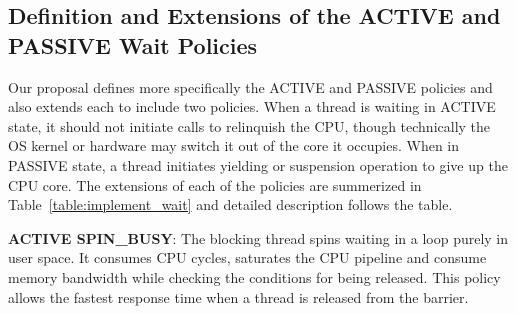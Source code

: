 \subsection{Definition and Extensions of the ACTIVE and PASSIVE Wait Policies}
Our proposal defines more specifically 
the ACTIVE and PASSIVE policies and also extends each to include two policies. 
When a thread is waiting in ACTIVE state, it should not initiate calls to
relinquish the CPU, though technically the OS kernel or hardware may switch it out of the core it occupies. 
When in PASSIVE state, a thread initiates yielding or suspension operation to give up the CPU core. 
The extensions of each of the policies are summerized in Table~\ref{table:implement_wait} and detailed description
follows the table. 
\begin{table}[ht]
	\centering
{}  
\label{table:implement_wait}
\caption{Implementation of wait policies }
\end{table}

	{\bf ACTIVE SPIN\_BUSY}: The blocking thread spins waiting in a loop purely in user space. 
		It consumes CPU cycles, saturates the CPU pipeline and consume memory bandwidth while checking
		the conditions for being released. This policy allows the fastest response time when a thread is
		released from the barrier. 

